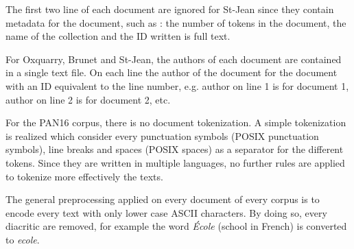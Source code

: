 The first two line of each document are ignored for St-Jean since they contain metadata for the document, such as : the number of tokens in the document, the name of the collection and the ID written is full text.

For Oxquarry, Brunet and St-Jean, the authors of each document are contained in a single text file.
On each line the author of the document for the document with an ID equivalent to the line number, e.g. author on line 1 is for document 1, author on line 2 is for document 2, etc.

For the PAN16 corpus, there is no document tokenization.
A simple tokenization is realized which consider every punctuation symbols (POSIX punctuation symbols), line breaks and spaces (POSIX spaces) as a separator for the different tokens.
Since they are written in multiple languages, no further rules are applied to tokenize more effectively the texts.

The general preprocessing applied on every document of every corpus is to encode every text with only lower case ASCII characters.
By doing so, every diacritic are removed, for example the word \textit{École} (school in French) is converted to \textit{ecole}.
